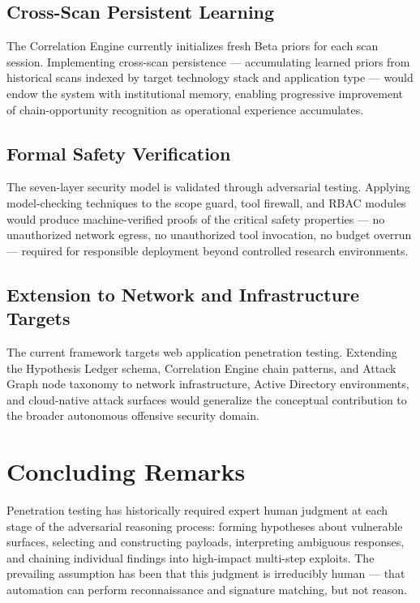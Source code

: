 \documentclass[12pt,a4paper,oneside,openany]{book}
\begin{document}
\subsection{Cross-Scan Persistent Learning}

The Correlation Engine currently initializes fresh Beta priors for each scan session. Implementing cross-scan persistence --- accumulating learned priors from historical scans indexed by target technology stack and application type --- would endow the system with institutional memory, enabling progressive improvement of chain-opportunity recognition as operational experience accumulates.

\subsection{Formal Safety Verification}

The seven-layer security model is validated through adversarial testing. Applying model-checking techniques to the scope guard, tool firewall, and RBAC modules would produce machine-verified proofs of the critical safety properties --- no unauthorized network egress, no unauthorized tool invocation, no budget overrun --- required for responsible deployment beyond controlled research environments.

\subsection{Extension to Network and Infrastructure Targets}

The current framework targets web application penetration testing. Extending the Hypothesis Ledger schema, Correlation Engine chain patterns, and Attack Graph node taxonomy to network infrastructure, Active Directory environments, and cloud-native attack surfaces would generalize the conceptual contribution to the broader autonomous offensive security domain.

\section{Concluding Remarks}

Penetration testing has historically required expert human judgment at each stage of the adversarial reasoning process: forming hypotheses about vulnerable surfaces, selecting and constructing payloads, interpreting ambiguous responses, and chaining individual findings into high-impact multi-step exploits. The prevailing assumption has been that this judgment is irreducibly human --- that automation can perform reconnaissance and signature matching, but not reason.
\end{document}
